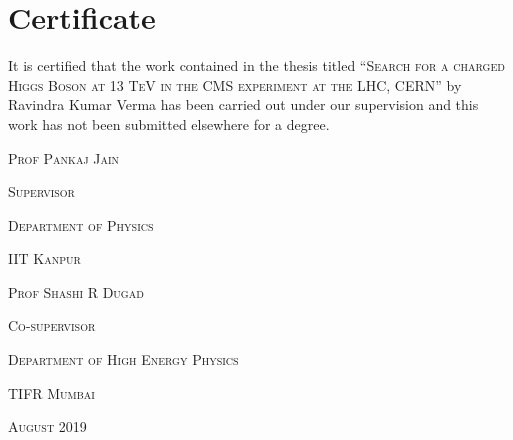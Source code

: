\chapter{Certificate}
It is certified that the work contained in the thesis titled 
``\textsc{Search for a charged Higgs Boson at 13 TeV in the CMS experiment at the LHC, CERN}'' by 
\rm{Ravindra Kumar Verma} has been carried out under our supervision and this work has not been submitted elsewhere for a degree.

\vspace{3cm}
\begin{flushright}
\textsc{Prof Pankaj Jain}

\textsc{Supervisor}

\textsc{Department of Physics}

\textsc{IIT Kanpur}
\end{flushright} 

\vspace{3cm}
\begin{flushright}
\textsc{Prof Shashi R Dugad}

\textsc{Co-supervisor}

\textsc{Department of High Energy Physics}

\textsc{TIFR Mumbai}
\end{flushright} 

\textsc{August 2019}
